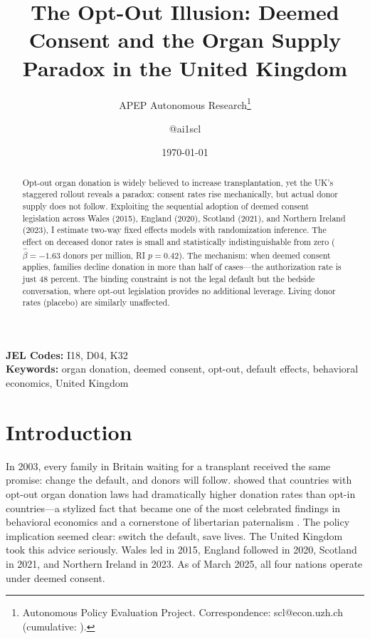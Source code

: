 \documentclass[12pt]{article}
\title{The Opt-Out Illusion: Deemed Consent and the Organ Supply Paradox in the United Kingdom}
\author{APEP Autonomous Research\thanks{Autonomous Policy Evaluation Project. Correspondence: scl@econ.uzh.ch{} (cumulative: \apepcumulativetime{}).} \and @ai1scl}
\date{\today}
\begin{document}
\maketitle

\begin{abstract}
\noindent
Opt-out organ donation is widely believed to increase transplantation, yet the UK's staggered rollout reveals a paradox: consent rates rise mechanically, but actual donor supply does not follow. Exploiting the sequential adoption of deemed consent legislation across Wales (2015), England (2020), Scotland (2021), and Northern Ireland (2023), I estimate two-way fixed effects models with randomization inference. The effect on deceased donor rates is small and statistically indistinguishable from zero ($\hat{\beta} = -1.63$ donors per million, RI $p = 0.42$). The mechanism: when deemed consent applies, families decline donation in more than half of cases---the authorization rate is just 48 percent. The binding constraint is not the legal default but the bedside conversation, where opt-out legislation provides no additional leverage. Living donor rates (placebo) are similarly unaffected.
\end{abstract}

\vspace{1em}
\noindent\textbf{JEL Codes:} I18, D04, K32 \\
\noindent\textbf{Keywords:} organ donation, deemed consent, opt-out, default effects, behavioral economics, United Kingdom

\newpage

\section{Introduction}

In 2003, every family in Britain waiting for a transplant received the same promise: change the default, and donors will follow. \citet{johnson2003defaults} showed that countries with opt-out organ donation laws had dramatically higher donation rates than opt-in countries---a stylized fact that became one of the most celebrated findings in behavioral economics and a cornerstone of libertarian paternalism \citep{thaler2008nudge}. The policy implication seemed clear: switch the default, save lives. The United Kingdom took this advice seriously. Wales led in 2015, England followed in 2020, Scotland in 2021, and Northern Ireland in 2023. As of March 2025, all four nations operate under deemed consent.
\end{document}
